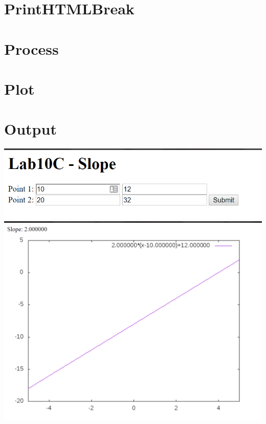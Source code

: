 \documentclass{article}
\begin{document}
\newpage\section*{PrintHTMLBreak}


\newpage\section*{Process}


\newpage\section*{Plot}


\newpage\section*{Output}
\includegraphics[width=\textwidth]{Working1.png}
\includegraphics[width=\textwidth]{Working2.png}

\marginnote{}
\end{document}
